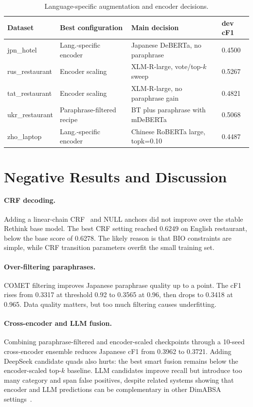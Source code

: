 \documentclass[runningheads]{llncs}
\begin{document}
\begin{table}[t]
\centering
\caption{Language-specific augmentation and encoder decisions.}
\label{tab:recipes}
\begin{tabular}{llll}
\toprule
Dataset & Best configuration & Main decision & dev cF1 \\
\midrule
jpn\_hotel & Lang.-specific encoder & Japanese DeBERTa, no paraphrase & 0.4500 \\
rus\_restaurant & Encoder scaling & XLM-R-large, vote/top-$k$ sweep & 0.5267 \\
tat\_restaurant & Encoder scaling & XLM-R-large, no paraphrase gain & 0.4821 \\
ukr\_restaurant & Paraphrase-filtered recipe & BT plus paraphrase with mDeBERTa & 0.5068 \\
zho\_laptop & Lang.-specific encoder & Chinese RoBERTa large, topk=0.10 & 0.4487 \\
\bottomrule
\end{tabular}
\end{table}

\section{Negative Results and Discussion}

\paragraph{CRF decoding.}
Adding a linear-chain CRF~\cite{lafferty2001crf} and \textsc{NULL} anchors did not improve
over the stable Rethink base model. The best CRF setting reached 0.6249
on English restaurant, below the base score of 0.6278. The likely reason is that BIO constraints
are simple, while CRF transition parameters overfit the small training
set.

\paragraph{Over-filtering paraphrases.}
COMET filtering improves Japanese paraphrase quality up to a point.
The cF1 rises from 0.3317 at threshold 0.92 to 0.3565 at 0.96, then
drops to 0.3418 at 0.965. Data quality matters, but too much filtering
causes underfitting.

\paragraph{Cross-encoder and LLM fusion.}
Combining paraphrase-filtered and encoder-scaled checkpoints through a
10-seed cross-encoder ensemble reduces Japanese cF1 from 0.3962 to
0.3721. Adding DeepSeek
candidate quads also hurts: the best smart fusion remains below the
encoder-scaled top-$k$ baseline. LLM candidates improve recall but introduce too
many category and span false positives, despite related systems showing
that encoder and LLM predictions can be complementary in other DimABSA
settings~\cite{quadai2026}.
\end{document}
